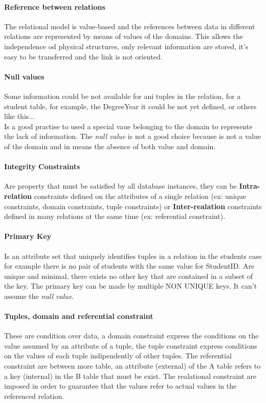 \documentclass[12pt]{article}
\begin{document}
\paragraph{Reference between relations}
The relational model is value-based and the references between data in different relations are represented by means of values of the domains. This allows the independence od physical structures, only relevant information are stored, it's easy to be transferred and the link is not oriented.

\paragraph{Null values}
Some information could be not available for ani tuples in the relation, for a student table, for example, the DegreeYear it could be not yet defined, or others like this...\\
Is a good practise to used a special vaue belonging to the domain to represente the lack of information. The \textit{null value} is not a good choice because is not a value of the domain and in means the absence of both value and domain.

\paragraph{Integrity Constraints}
Are property that must be satisfied by all database instances, they can be \textbf{Intra-relation} constraints defined on the attributes of a single relation (ex: unique constraints, domain constraints, tuple constraints) or \textbf{Inter-realation} constraints defined in many relations at the same time (ex: referential constraint).

\paragraph{Primary Key}
Is an attribute set that uniquely identifies tuples in a relation in the students case for example there is no pair of students with the same value for StudentID. Are unique and minimal, there exists no other key that are contained in a subset of the key. The primary key can be made by multiple NON UNIQUE keys. It can't assume the \textit{null value}.

\paragraph{Tuples, domain and referential constraint}
These are condition over data, a domain constraint express the conditions on the value assumed by an attribute of a tuple, the tuple constraint express conditions on the values of each tuple indipendently of other tuples. The referential constraint are between more table, an attribute (external) of the A table refers to a key (internal) in the B table that must be exist. The realational constraint are imposed in order to guarantee that the values refer to actual values in the referenced relation.
\end{document}
